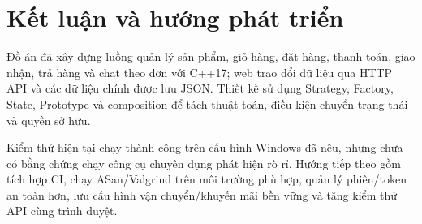 \chapter*{Kết luận và hướng phát triển}

Đồ án đã xây dựng luồng quản lý sản phẩm, giỏ hàng, đặt hàng, thanh toán, giao nhận, trả hàng và chat theo đơn với C++17; web trao đổi dữ liệu qua HTTP API và các dữ liệu chính được lưu JSON. Thiết kế sử dụng Strategy, Factory, State, Prototype và composition để tách thuật toán, điều kiện chuyển trạng thái và quyền sở hữu.

Kiểm thử hiện tại chạy thành công trên cấu hình Windows đã nêu, nhưng chưa có bằng chứng chạy công cụ chuyên dụng phát hiện rò rỉ. Hướng tiếp theo gồm tích hợp CI, chạy ASan/Valgrind trên môi trường phù hợp, quản lý phiên/token an toàn hơn, lưu cấu hình vận chuyển/khuyến mãi bền vững và tăng kiểm thử API cùng trình duyệt.
